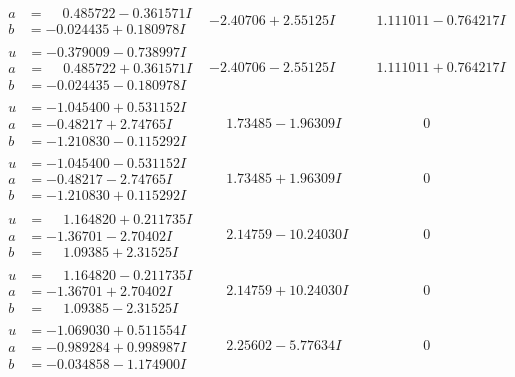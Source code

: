 \documentclass[1p]{elsarticle_modified}
\theoremstyle{definition}
\begin{document}
$$\begin{array}{c|c|c}
\begin{aligned}
a &= \phantom{-}0.485722 - 0.361571 I \\
b &= -0.024435 + 0.180978 I\end{aligned}
 & -2.40706 + 2.55125 I & \phantom{-}1.111011 - 0.764217 I \\ \hline\begin{aligned}
u &= -0.379009 - 0.738997 I \\
a &= \phantom{-}0.485722 + 0.361571 I \\
b &= -0.024435 - 0.180978 I\end{aligned}
 & -2.40706 - 2.55125 I & \phantom{-}1.111011 + 0.764217 I \\ \hline\begin{aligned}
u &= -1.045400 + 0.531152 I \\
a &= -0.48217 + 2.74765 I \\
b &= -1.210830 - 0.115292 I\end{aligned}
 & \phantom{-}1.73485 - 1.96309 I & \phantom{-0.000000 } 0 \\ \hline\begin{aligned}
u &= -1.045400 - 0.531152 I \\
a &= -0.48217 - 2.74765 I \\
b &= -1.210830 + 0.115292 I\end{aligned}
 & \phantom{-}1.73485 + 1.96309 I & \phantom{-0.000000 } 0 \\ \hline\begin{aligned}
u &= \phantom{-}1.164820 + 0.211735 I \\
a &= -1.36701 - 2.70402 I \\
b &= \phantom{-}1.09385 + 2.31525 I\end{aligned}
 & \phantom{-}2.14759 - 10.24030 I & \phantom{-0.000000 } 0 \\ \hline\begin{aligned}
u &= \phantom{-}1.164820 - 0.211735 I \\
a &= -1.36701 + 2.70402 I \\
b &= \phantom{-}1.09385 - 2.31525 I\end{aligned}
 & \phantom{-}2.14759 + 10.24030 I & \phantom{-0.000000 } 0 \\ \hline\begin{aligned}
u &= -1.069030 + 0.511554 I \\
a &= -0.989284 + 0.998987 I \\
b &= -0.034858 - 1.174900 I\end{aligned}
 & \phantom{-}2.25602 - 5.77634 I & \phantom{-0.000000 } 0 \\ \hline\begin{aligned}

\end{aligned}
\end{array}$$
\end{document}
